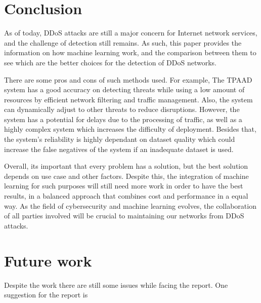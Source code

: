 \documentclass[a4paper, 12pt]{article}
\begin{document}
\section{Conclusion}

As of today, DDoS attacks are still a major concern for Internet network services, and the challenge of detection still remains. As such, this paper provides the information on how machine learning work, and the comparison between them to see which are the better choices for the detection of DDoS networks. 

There are some pros and cons of such methods used. For example, The TPAAD system has a good accuracy on detecting threats while using a low amount of resources by efficient network filtering and traffic management. Also, the system can dynamically adjust to other threats to reduce disruptions. However, the system has a potential for delays due to the processing of traffic, as well as a highly complex system which increases the difficulty of deployment. Besides that, the system's reliability is highly dependant on dataset quality which could increase the false negatives of the system if an inadequate dataset is used. \cite{3}

Overall, its important that every problem has a solution, but the best solution depends on use case and other factors. Despite this, the integration of machine learning for such purposes will still need more work in order to have the best results, in a balanced approach that combines cost and performance in a equal way. As the field of cybersecurity and machine learning evolves, the collaboration of all parties involved will be crucial to maintaining our networks from DDoS attacks.  

\section{Future work}
Despite the work there are still some issues while facing the report. One suggestion for the report is 


{}
\end{document}
